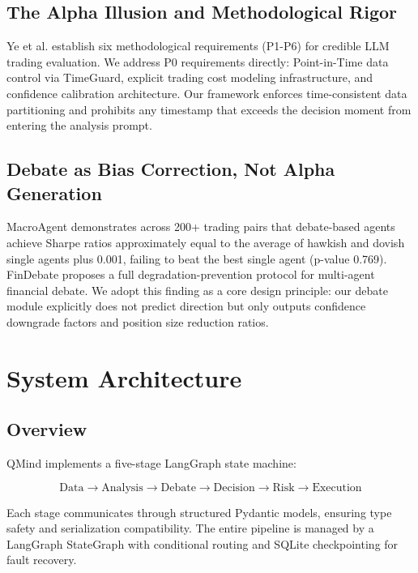 \documentclass[twocolumn]{article}
\begin{document}
\subsection{The Alpha Illusion and Methodological Rigor}

Ye et al.\cite{ye2026alpha} establish six methodological requirements (P1-P6) for credible LLM trading evaluation. We address P0 requirements directly: Point-in-Time data control via TimeGuard, explicit trading cost modeling infrastructure, and confidence calibration architecture. Our framework enforces time-consistent data partitioning and prohibits any timestamp that exceeds the decision moment from entering the analysis prompt.

\subsection{Debate as Bias Correction, Not Alpha Generation}

MacroAgent\cite{macroeconomists2026} demonstrates across 200+ trading pairs that debate-based agents achieve Sharpe ratios approximately equal to the average of hawkish and dovish single agents plus 0.001, failing to beat the best single agent (p-value 0.769). FinDebate\cite{findebate2025} proposes a full degradation-prevention protocol for multi-agent financial debate. We adopt this finding as a core design principle: our debate module explicitly does not predict direction but only outputs confidence downgrade factors and position size reduction ratios.

\section{System Architecture}

\subsection{Overview}

QMind implements a five-stage LangGraph state machine:

\begin{equation}
\text{Data} \rightarrow \text{Analysis} \rightarrow \text{Debate} \rightarrow \text{Decision} \rightarrow \text{Risk} \rightarrow \text{Execution}
\end{equation}

Each stage communicates through structured Pydantic models, ensuring type safety and serialization compatibility. The entire pipeline is managed by a LangGraph StateGraph with conditional routing and SQLite checkpointing for fault recovery.
\end{document}
